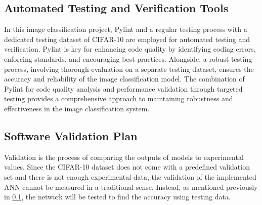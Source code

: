 \documentclass[12pt, titlepage]{article}
\begin{document}
\subsection{Automated Testing and Verification Tools}\label{AutoTestVerTools}

In this image classification project, Pylint \cite{pylint} and a regular testing process with a 
dedicated testing dataset of CIFAR-10 \cite{CIFAR10} are employed for automated testing and verification. 
Pylint \cite{pylint} is key for enhancing code quality by identifying coding errors, 
enforcing standards, and encouraging best practices. Alongside, a robust 
testing process, involving thorough evaluation on a separate testing dataset, 
ensures the accuracy and reliability of the image classification model. The combination of 
Pylint \cite{pylint} for code quality analysis and performance validation through targeted testing 
provides a comprehensive approach to maintaining robustness and effectiveness in the 
image classification system.




\subsection{Software Validation Plan}\label{SoftwareValPlan}

Validation is the process of comparing the outputs of models to experimental values. 
Since the CIFAR-10 dataset \cite{CIFAR10} does not come with a predefined validation 
set and there is not enough experimental data, the validation of the implemented ANN 
cannot be measured in a traditional sense. Instead, as mentioned previously in \ref{AutoTestVerTools}, the network 
will be tested to find the accuracy using testing data. 
\end{document}
